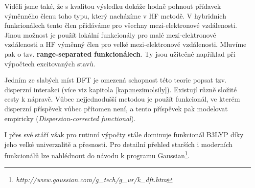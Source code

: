 Viděli jsme také, že s kvalitou výsledku dokáže hodně pohnout přídavek výměnného členu toho typu, který nacházíme v HF metodě. V hybridních funkcionálech tento člen přidáváme pro všechny mezi-elektronové vzdálenosti. Jinou možnost je použít lokální funkcionály pro malé mezi-elektronové vzdálenosti a HF výměnný člen pro velké mezi-elektronové vzdálenosti. Mluvíme pak o tzv. \textbf{range-separated funkcionálech}. Ty jsou užitečné například při výpočtech excitovaných stavů. 

Jedním ze slabých míst DFT je omezená schopnost této teorie popsat tzv. disperzní interakci (více viz kapitola \ref{kap:mezimolsily}).
Existují různě složité cesty k nápravě. Vůbec nejjednodušší metodou je použít funkcionál, ve kterém disperzní příspěvek vůbec přítomen není, a tento příspěvek pak modelovat empiricky (\textit{Dispersion-corrected functional}).  


I přes své stáří však pro rutinní výpočty stále dominuje funkcionál B3LYP díky jeho velké univerzalitě a přesnosti.
Pro detailní přehled starších i moderních funkcionálů lze nahlédnout do návodu k programu Gaussian\footnote{\textit{http://www.gaussian.com/g\_tech/g\_ur/k\_dft.htm}}.

